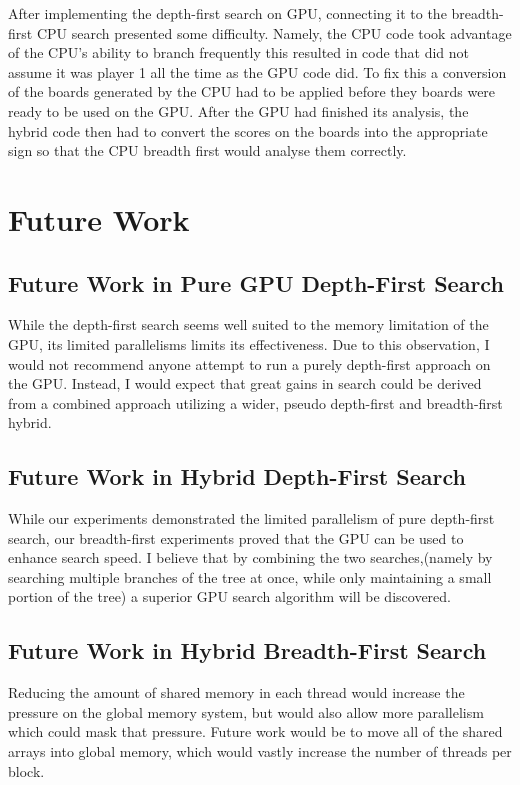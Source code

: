 \documentclass[11pt]{article}
\begin{document}
    After implementing the depth-first search on GPU, connecting it to the breadth-first CPU search
presented some difficulty. Namely, the CPU code took advantage of the CPU's ability to branch frequently
this resulted in code that did not assume it was player 1 all the time as the GPU code did. To fix this
a conversion of the boards generated by the CPU had to be applied before they boards were ready to be used on the GPU.
After the GPU had finished its analysis, the hybrid code then had to convert the scores on the boards into
the appropriate sign so that the CPU breadth first would analyse them correctly.


\newpage
\section{Future Work}
\subsection{Future Work in Pure GPU Depth-First Search}
While the depth-first search seems well suited to the memory limitation of the GPU, its limited parallelisms limits its effectiveness. Due to this
observation, I would not recommend anyone attempt to run a purely depth-first approach on the GPU. Instead, I would expect that great gains in search could be derived from
a combined approach utilizing a wider, pseudo depth-first and breadth-first hybrid.
\subsection{Future Work in Hybrid Depth-First Search}
While our experiments demonstrated the limited parallelism of pure depth-first search, our breadth-first experiments proved that the GPU can be used to enhance search speed.
I believe that by combining the two searches,(namely by searching multiple branches of the tree at once, while only maintaining a small portion of the tree) a superior
GPU search algorithm will be discovered.
\subsection{Future Work in Hybrid Breadth-First Search}
Reducing the amount of shared memory in each thread would increase the pressure
on the global memory system, but would also allow more parallelism which could
mask that pressure. Future work would be to move all of the shared arrays into
global memory, which would vastly increase the number of threads per block.
\end{document}
